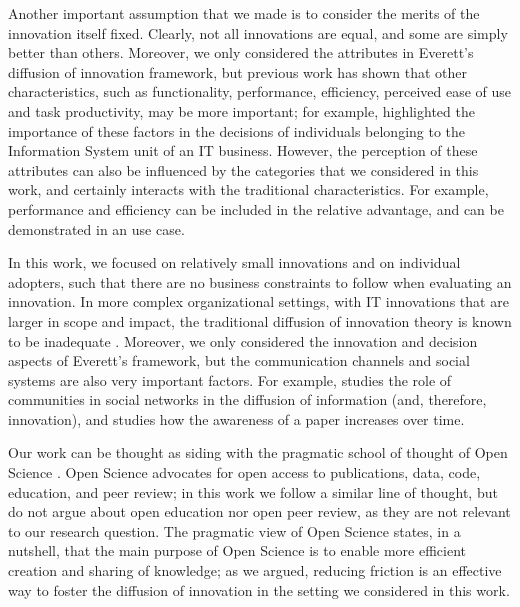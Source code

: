 \documentclass[12pt]{article}
\begin{document}
Another important assumption that we made is to consider the merits of the innovation itself fixed. Clearly, not all innovations are equal, and some are simply better than others. Moreover, we only considered the attributes in Everett's diffusion of innovation framework, but previous work has shown that other characteristics, such as functionality, performance, efficiency, perceived ease of use and task productivity, may be more important; for example, \cite{itlocus} highlighted the importance of these factors in the decisions of individuals belonging to the Information System unit of an IT business. However, the perception of these attributes can also be influenced by the categories that we considered in this work, and certainly interacts with the traditional characteristics. For example, performance and efficiency can be included in the relative advantage, and can be demonstrated in an use case.

In this work, we focused on relatively small innovations and on individual adopters, such that there are no business constraints to follow when evaluating an innovation. In more complex organizational settings, with IT innovations that are larger in scope and impact, the traditional diffusion of innovation theory is known to be inadequate \citep{whatswrongwithdoi}. Moreover, we only considered the innovation and decision aspects of Everett's framework, but the communication channels and social systems are also very important factors. For example, \cite{communities} studies the role of communities in social networks in the diffusion of information (and, therefore, innovation), and \cite{paperawareness} studies how the awareness of a paper increases over time.

Our work can be thought as siding with the pragmatic school of thought of Open Science \citep{fiveopenscience}. Open Science advocates for open access to publications, data, code, education, and peer review; in this work we follow a similar line of thought, but do not argue about open education nor open peer review, as they are not relevant to our research question. The pragmatic view of Open Science states, in a nutshell, that the main purpose of Open Science is to enable more efficient creation and sharing of knowledge; as we argued, reducing friction is an effective way to foster the diffusion of innovation in the setting we considered in this work.
\end{document}
